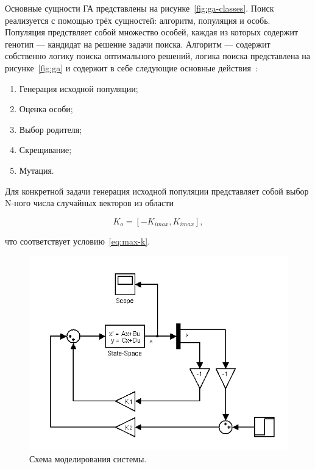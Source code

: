 \documentclass[russian,utf8,emptystyle,12pt]{eskdtext}
\begin{document}
	    Основные сущности ГА представлены на рисунке~\ref{fig:ga-classes}. Поиск реализуется с помощью трёх сущностей: алгоритм, популяция и особь. Популяция предствляет собой множество особей, каждая из которых содержит генотип --- кандидат на решение задачи поиска. Алгоритм --- содержит собственно логику поиска оптимального решений, логика поиска  представлена на рисунке~\ref{fig:ga} и содержит в себе следующие основные действия~\cite{bib:metaheuristics}:
                	    
        \begin{enumerate}
            \item Генерация исходной популяции;
            \item Оценка особи;
            \item Выбор родителя;
            \item Скрещивание;          
            \item Мутация.         
        \end{enumerate}
                
    	Для конкретной задачи генерация исходной популяции представляет собой выбор N-ного числа случайных векторов из области 
    	
        \begin{equation}
           K_o = [-K_{imax}, K_{imax}], 
           \label{eq:search-area}       
        \end{equation} 
        
        что соответствует условию~\ref{eq:max-k}.
	    
	    \begin{figure}[h!]
	        \centering
	        \includegraphics[scale=0.5]{simulation.png}
	        \caption{Схема моделирования системы.}
	        \label{fig:simulation}
	    \end{figure}
            	
\end{document}
